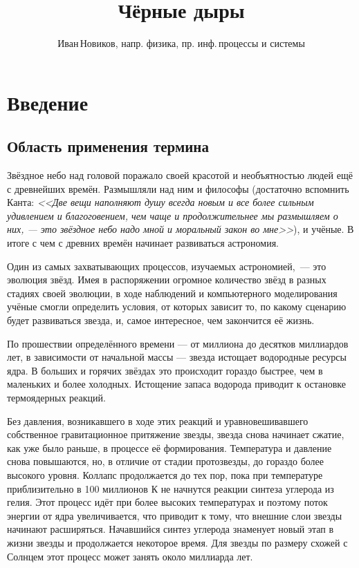 \documentclass[a4paper, 12pt]{extarticle}
\author{Иван\,Новиков, напр. физика, пр. инф.\,процессы и системы}
\title{Чёрные дыры}
\begin{document}
  \maketitle

  \vspace{1.3cm}

  \tableofcontents

  \section{Введение}

  \subsection{Область применения термина}

  Звёздное небо над головой поражало своей красотой и необъятностью людей ещё с древнейших времён.
  Размышляли над ним и философы (достаточно вспомнить Канта: \emph{<<Две вещи наполняют душу всегда
  новым и все более сильным удивлением и благоговением, чем чаще и продолжительнее мы размышляем о
  них, — это звёздное небо надо мной и моральный закон во мне>>}), и учёные. В итоге с чем с древних
  времён начинает развиваться астрономия.

  Один из самых захватывающих процессов, изучаемых астрономией,~--- это эволюция звёзд. Имея в
  распоряжении огромное количество звёзд в разных стадиях своей эволюции, в ходе наблюдений и
  компьютерного моделирования учёные смогли определить условия, от которых зависит то, по какому
  сценарию будет развиваться звезда, и, самое интересное, чем закончится её жизнь.

  По прошествии определённого времени — от миллиона до десятков миллиардов лет, в зависимости от
  начальной массы — звезда истощает водородные ресурсы ядра. В больших и горячих звёздах это
  происходит гораздо быстрее, чем в маленьких и более холодных. Истощение запаса водорода приводит к
  остановке термоядерных реакций.

  Без давления, возникавшего в ходе этих реакций и уравновешивавшего собственное гравитационное
  притяжение звезды, звезда снова начинает сжатие, как уже было раньше, в процессе её формирования.
  Температура и давление снова повышаются, но, в отличие от стадии протозвезды, до гораздо более
  высокого уровня. Коллапс продолжается до тех пор, пока при температуре приблизительно в 100
  миллионов К не начнутся реакции синтеза углерода из гелия. Этот процесс идёт при более высоких
  температурах и поэтому поток энергии от ядра увеличивается, что приводит к тому, что внешние слои
  звезды начинают расширяться. Начавшийся синтез углерода знаменует новый этап в жизни звезды и
  продолжается некоторое время. Для звезды по размеру схожей с Солнцем этот процесс может занять
  около миллиарда лет.
\end{document}
